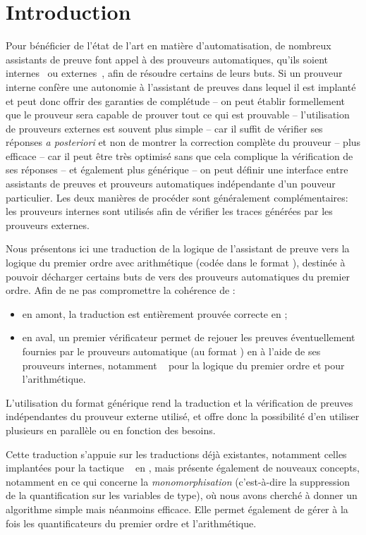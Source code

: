 \section{Introduction}

Pour bénéficier de l'état de l'art en matière d'automatisation, de
nombreux assistants de preuve font appel à des prouveurs automatiques,
qu'ils soient internes~\cite{Hurd05,Lescuyer11} ou
externes~\cite{Paulson10,DBLP:conf/cpp/ArmandFGKTW11}, afin de résoudre
certains de leurs buts. Si un prouveur interne confère une autonomie à
l'assistant de preuves dans lequel il est implanté et peut donc offrir
des garanties de complétude -- on peut établir formellement que le
prouveur sera capable de prouver tout ce qui est prouvable --
l'utilisation de prouveurs externes est souvent plus simple -- car il
suffit de vérifier ses réponses \emph{a posteriori} et non de montrer la
correction complète du prouveur -- plus efficace -- car il peut être
très optimisé sans que cela complique la vérification de ses réponses --
et également plus générique -- on peut définir une interface entre
assistants de preuves et prouveurs automatiques indépendante d'un
pouveur particulier. Les deux manières de procéder sont généralement
complémentaires: les prouveurs internes sont utilisés afin de vérifier
les traces générées par les prouveurs externes.

Nous présentons ici une traduction de la logique de l'assistant de
preuve \holfour vers la logique du premier ordre avec arithmétique
(codée dans le format \tff), destinée à pouvoir décharger certains buts
de \holfour vers des prouveurs automatiques du premier ordre. Afin de ne
pas compromettre la cohérence de \holfour:
\begin{itemize}
\item en amont, la traduction est entièrement prouvée correcte en
  \holfour;
\item en aval, un premier vérificateur permet de rejouer les preuves
  éventuellement fournies par le prouveurs automatique (au format \tff)
  en \holfour à l'aide de ses prouveurs internes, notamment
  \metis~\cite{Hurd05} pour la logique du premier ordre et \cooper pour
  l'arithmétique.
\end{itemize}
L'utilisation du format \tff générique rend la traduction et la
vérification de preuves indépendantes du prouveur externe utilisé, et
offre donc la possibilité d'en utiliser plusieurs en parallèle ou en
fonction des besoins.

Cette traduction s'appuie sur les traductions déjà existantes, notamment
celles implantées pour la tactique \sledgehammer~\cite{Paulson10} en
\isabellehol, mais présente également de nouveaux concepts, notamment en
ce qui concerne la \emph{monomorphisation} (c'est-à-dire la suppression
de la quantification sur les variables de type), où nous avons cherché à
donner un algorithme simple mais néanmoins efficace. Elle permet
également de gérer à la fois les quantificateurs du premier ordre et
l'arithmétique.

